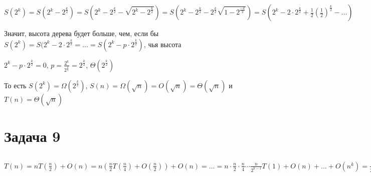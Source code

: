 \documentclass[a4paper,12pt]{article} %
\begin{document}
$S(2^k)=S(2^k-2^{\frac{k}{2}})=S(2^k-2^{\frac{k}{2}}-\sqrt{2^k-2^{\frac{k}{2}}})=S(2^k-2^{\frac{k}{2}}-2^{\frac{k}{2}}\sqrt{1-2^{\frac{-k}{2}}})=S(2^k-2\cdot 2^{\frac{k}{2}}+\frac{1}{2}(\frac{1}{2})^{\frac{k}{2}}-\ldots)$

Значит, высота дерева будет больше, чем, если бы $S(2^k)=S(2^k-2\cdot 2^{\frac{k}{2}}=\ldots=S(2^k-p\cdot 2^{\frac{k}{2}})$, чья высота 

$2^k-p\cdot 2^{\frac{k}{2}}=0$, $p=\frac{2^k}{2^\frac{k}{2}}=2^\frac{k}{2}$, $\Theta(2^\frac{k}{2})$

То есть $S(2^k)=\Omega(2^\frac{k}{2})$, $S(n)=\Omega(\sqrt n)=O(\sqrt n)=\Theta(\sqrt n)$ и $T(n)=\Theta(\sqrt{n})$
	

\section{Задача 9}
\hspace{5mm}
$T(n)=nT(\frac{n}{2})+O(n)=n(\frac{n}{2}T(\frac{n}{4})+O(\frac{n}{2}))+O(n)=\ldots
=n\cdot\frac{n}{2}\cdot\frac{n}{4}\cdots\frac{n}{2^{k-1}}T(1)+O(n)+\ldots+O(n^k)=
\frac{n^{\log_2{n}}}{2^{1+\ldots+\log_2{n}-1}}T(1)+O(n^{\log_2{n}})=
\frac{n^{\log_2{n}}}{2^{\frac{1}{2}\log_2{n}(\log_2{n}-1)}}T(1)+O(n^{\log_2{n}})=
\frac{n^{\log_2{n}}}{2^{\frac{1}{2}\log_2^2{n}}}\cdot 2^{\frac{\log_2{n}}{2}}+O(n^{\log_2{n}})=
n^{\log_2{n}}\cdot 2^{-\log_2^2{n^{\frac{1}{\sqrt{2}}}}}\cdot\sqrt{n}+O(n^{\log_2{n}})=
n^{\log_2{n}}\cdot (n^{\frac{1}{\sqrt{2}}})^{-\log_2{n^{\frac{1}{\sqrt{2}}}}}\cdot\sqrt{n}+O(n^{\log_2{n}})=
n^{\log_2{n}}\cdot n^{-\frac{1}{2}\log_2{n}}\cdot\sqrt{n}+O(n^{\log_2{n}})=
\Theta({\sqrt{n}^{\log_2{n}}}\sqrt{n})=\Theta(n^{\frac{1}{2}\log_2{2n}})$
\end{document}
